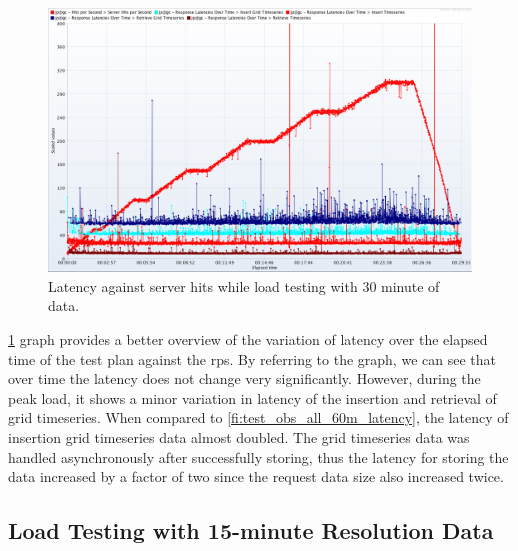 \begin{figure}[htp]
    \centering
    \includegraphics[width=1.0\textwidth]{results/obs/all/obs_all_30m_res_latencies_against_hits.png}
    \caption{Latency against server hits while load testing with 30 minute of data.}
    \label{fi:test_obs_all_30m_latency}
\end{figure}
\cref{fi:test_obs_all_30m_latency} graph provides a better overview of the variation of latency over the elapsed time of the test plan against the \acrshort{rps}. By referring to the graph, we can see that over time the latency does not change very significantly. However, during the peak load, it shows a minor variation in latency of the insertion and retrieval of grid timeseries. When compared to \cref{fi:test_obs_all_60m_latency}, the latency of insertion grid timeseries data almost doubled. The grid timeseries data was handled asynchronously after successfully storing, thus the latency for storing the data increased by a factor of two since the request data size also increased twice.


\subsection{Load Testing with 15-minute Resolution Data}
\label{subse:obs_test_plan_all_15min}

